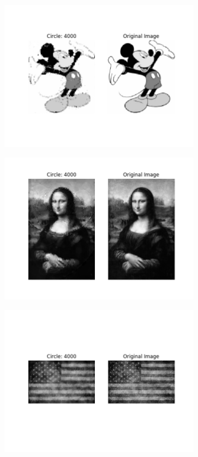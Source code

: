 \documentclass[12pt]{article}
\begin{document}
\begin{figure}[H]
\centering
\noindent\includegraphics[width=0.75\textwidth]{../results/mickey/mickey_4000}
\end{figure}
\begin{figure}[H]
\centering
\noindent\includegraphics[width=0.75\textwidth]{../results/mona_lisa/mona_lisa_4000}
\end{figure}
\begin{figure}[H]
\centering
\noindent\includegraphics[width=0.75\textwidth]{../results/old_glory/old_glory_4000}
\end{figure}
\end{document}
